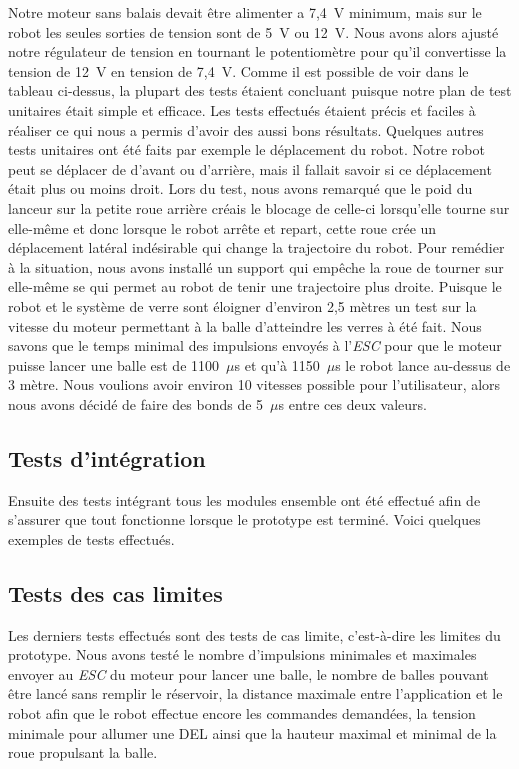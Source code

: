 Notre moteur sans balais devait être alimenter a 7,4~V minimum, mais sur le robot les seules sorties de tension sont de 5~V ou 12~V.
Nous avons alors ajusté notre régulateur de tension en tournant le potentiomètre pour qu’il convertisse la tension de 12~V en tension de 7,4~V.
Comme il est possible de voir dans le tableau ci-dessus, la plupart des tests étaient concluant puisque notre plan de test unitaires était simple et efficace.
Les tests effectués étaient précis et faciles à réaliser ce qui nous a permis d’avoir des aussi bons résultats.
Quelques autres tests unitaires ont été faits par exemple le déplacement du robot.
Notre robot peut se déplacer de d’avant ou d’arrière, mais il fallait savoir si ce déplacement était plus ou moins droit.
Lors du test, nous avons remarqué que le poid du lanceur sur la petite roue arrière créais le blocage de celle-ci lorsqu’elle tourne sur elle-même et donc lorsque le robot arrête et repart, cette roue crée un déplacement latéral indésirable qui change la trajectoire du robot.
Pour remédier à la situation, nous avons installé un support qui empêche la roue de tourner sur elle-même se qui permet au robot de tenir une trajectoire plus droite.
Puisque le robot et le système de verre sont éloigner d’environ 2,5 mètres un test sur la vitesse du moteur permettant à la balle d’atteindre les verres à été fait.
Nous savons que le temps minimal des impulsions envoyés à l'\emph{ESC} pour que le moteur puisse lancer une balle est de 1100~$\mu$s et qu’à 1150~$\mu$s le robot lance au-dessus de 3 mètre.
Nous voulions avoir environ 10 vitesses possible pour l’utilisateur, alors nous avons décidé de faire des bonds de 5~$\mu$s entre ces deux valeurs.

\subsection{Tests d'intégration}

Ensuite des tests intégrant tous les modules ensemble ont été effectué afin de s’assurer que tout fonctionne lorsque le prototype est terminé.
Voici quelques exemples de tests effectués.


\subsection{Tests des cas limites}

Les derniers tests effectués sont des tests de cas limite, c’est-à-dire les limites du prototype.
Nous avons testé le nombre d’impulsions minimales et maximales envoyer au \emph{ESC} du moteur pour lancer une balle, le nombre de balles pouvant être lancé sans remplir le réservoir, la distance maximale entre l’application et le robot afin que le robot effectue encore les commandes demandées, la tension minimale pour allumer une DEL ainsi que la hauteur maximal et minimal de la roue propulsant la balle.


